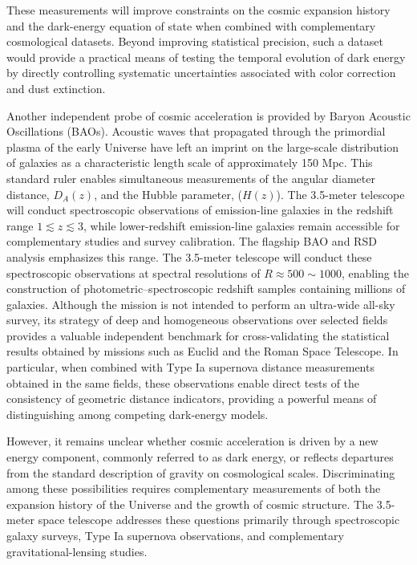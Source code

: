 These measurements will improve constraints on the cosmic expansion history and the dark-energy equation of state when combined with complementary cosmological datasets.
Beyond improving statistical precision, such a dataset would provide a practical means of testing the temporal evolution of dark energy by directly controlling systematic uncertainties associated with color correction and dust extinction.

Another independent probe of cosmic acceleration is provided by Baryon Acoustic Oscillations (BAOs). Acoustic waves that propagated through the primordial plasma of the early Universe have left an imprint on the large-scale distribution of galaxies as a characteristic length scale of approximately 150 Mpc. This standard ruler enables simultaneous measurements of the angular diameter distance, $D_A(z)$, and the Hubble parameter, ($H(z)$). The 3.5-meter telescope will conduct spectroscopic observations of emission-line galaxies in the redshift range $1\lesssim z\lesssim3$, while lower-redshift emission-line galaxies remain accessible for complementary studies and survey calibration. The flagship BAO and RSD analysis emphasizes this range. The 3.5-meter telescope will conduct these spectroscopic observations at spectral resolutions of $R \approx 500 \sim 1000$, enabling the construction of photometric--spectroscopic redshift samples containing millions of galaxies. Although the mission is not intended to perform an ultra-wide all-sky survey, its strategy of deep and homogeneous observations over selected fields provides a valuable independent benchmark for cross-validating the statistical results obtained by missions such as Euclid and the Roman Space Telescope. In particular, when combined with Type Ia supernova distance measurements obtained in the same fields, these observations enable direct tests of the consistency of geometric distance indicators, providing a powerful means of distinguishing among competing dark-energy models.

However, it remains unclear whether cosmic acceleration is driven by a new energy component, commonly referred to as dark energy, or reflects departures from the standard description of gravity on cosmological scales. Discriminating among these possibilities requires complementary measurements of both the expansion history of the Universe and the growth of cosmic structure. The 3.5-meter space telescope addresses these questions primarily through spectroscopic galaxy surveys, Type Ia supernova observations, and complementary gravitational-lensing studies.

